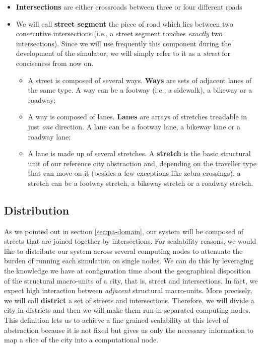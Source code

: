 \begin{itemize}
  \item \textbf{Intersections} are either crossroads between three or four
    different roads
  \item We will call \textbf{street segment} the piece of road which lies
    between two consecutive intersections (i.e., a street segment touches
    \textit{exactly} two intersections). Since we will use frequently this
    component during the development of the simulator, we will simply refer to
    it as a \textit{street} for conciseness from now on.
    \begin{itemize}
      \item A street is composed of several ways. \textbf{Ways} are sets of
        adjacent lanes of the same type. A way can be a footway (i.e., a
        sidewalk), a bikeway or a roadway;
      \item A way is composed of lanes. \textbf{Lanes} are arrays of stretches
        treadable in just \textit{one} direction. A lane can be a footway lane,
        a bikeway lane or a roadway lane;
      \item A lane is made up of several stretches. A \textbf{stretch} is the
        basic structural unit of our reference city abstraction and, depending
        on the traveller type that can move on it (besides a few exceptions
        like zebra crossings), a stretch can be a footway stretch, a bikeway
        stretch or a roadway stretch.
    \end{itemize}
\end{itemize}


\subsection{Distribution}\label{sec:pa-distribution}
As we pointed out in section \ref{sec:pa-domain}, our system will be composed
of streets that are joined together by intersections.
For scalability reasons, we would like to distribute our system across several
computing nodes to attenuate the burden of running each simulation on single
nodes. We can do this by leveraging the knowledge we have at configuration time
about the geographical disposition of the structural macro-units of a city,
that is, street and intersections. In fact, we expect high interaction between
\textit{adjacent} structural macro-units.
More precisely, we will call \textbf{district} a set of streets and
intersections. Therefore, we will divide a city in districts and then we will
make them run in separated computing nodes. This definition lets us to achieve
a fine grained scalability at this level of abstraction because it is not
fixed but gives us only the necessary information to map a slice of the city
into a computational node.

